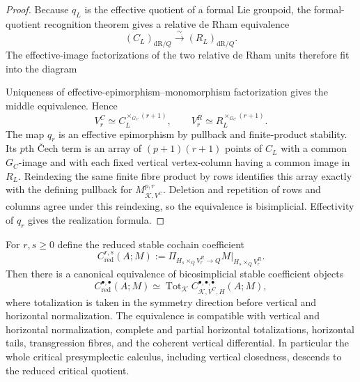 \begin{proof}
Because $q_L$ is the effective quotient of a formal Lie groupoid, the formal-quotient
recognition theorem gives a relative de Rham equivalence
\[
(C_L)_{\mathrm{dR}/Q}
\xrightarrow{\ \sim\ }
(R_L)_{\mathrm{dR}/Q}.
\]
The effective-image factorizations of the two relative de Rham units therefore fit
into the diagram
Uniqueness of effective-epimorphism--monomorphism factorization gives the middle
equivalence.  Hence
\[
V^C_r\simeq C_L^{\times_{G_C}(r+1)},
\qquad
V^R_r\simeq R_L^{\times_{G_C}(r+1)}.
\]
The map $q_r$ is an effective epimorphism by pullback and finite-product stability.
Its $p$th \v{C}ech term is an array of $(p+1)(r+1)$ points of $C_L$ with a common
$G_C$-image and with each fixed vertical vertex-column having a common image in
$R_L$.  Reindexing the same finite fibre product by rows identifies this array
exactly with the defining pullback for $M_{\mathcal K,V^C}^{p,r}$.  Deletion and
repetition of rows and columns agree under this reindexing, so the equivalence is
bisimplicial.  Effectivity of $q_r$ gives the realization formula.
\end{proof}

\begin{theorem}
\label{thm:symmetry-noether-descent-of-complete-critical-vertical-horizontal-calculus}
For $r,s\ge0$ define the reduced stable cochain coefficient
\[
C_{\mathrm{red}}^{r,s}(A;M)
:=
\Pi_{H_s\times_QV^R_r\to Q}
M|_{H_s\times_QV^R_r}.
\]
Then there is a canonical equivalence of bicosimplicial stable coefficient objects
\[
\boxed{
C_{\mathrm{red}}^{\bullet,\bullet}(A;M)
\simeq
\operatorname{Tot}_{\mathcal K}
C_{\mathcal K,V^C,H}^{\bullet,\bullet,\bullet}(A;M),
}
\]
where totalization is taken in the symmetry direction before vertical and
horizontal normalization.  The equivalence is compatible with vertical and
horizontal normalization, complete and partial horizontal totalizations,
horizontal tails, transgression fibres, and the coherent vertical differential.
In particular the whole critical presymplectic calculus, including vertical
closedness, descends to the reduced critical quotient.
\end{theorem}

